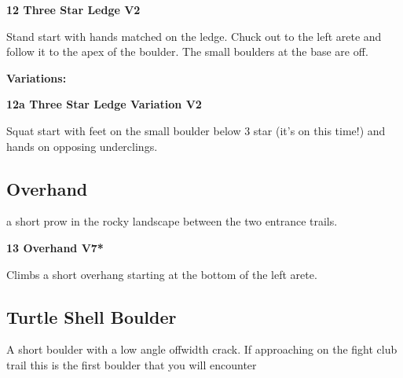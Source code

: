 \begin{multicols}{2}
		
			
			\needspace{1.5cm}
\label{rt:Three Star Ledge}
\colorbox{green!20}{
\parbox{0.95\linewidth}{
\textbf{
12 Three Star Ledge V2  
}}}

			\begin{adjustwidth}{0.5cm}{}			
			Stand start with hands matched on the ledge. Chuck out to the left arete and follow it to the apex of the boulder. The small boulders at the base are off.
			\end{adjustwidth}
			
				\begin{adjustwidth}{0.5cm}{}				
				\needspace{3cm}
				\textbf{Variations:} \newline
					
					\needspace{1.5cm}
\label{vr:Three Star Ledge Variation}
\colorbox{green!20}{
\parbox{0.95\linewidth}{
\textbf{
12a Three Star Ledge Variation V2  
}}}

					\begin{adjustwidth}{0.5cm}{}			
					Squat start with feet on the small boulder below 3 star (it's on this time!) and hands on opposing underclings.
					\end{adjustwidth}
					
					
				\end{adjustwidth}
			
		


		\needspace{1.5cm}
		\subsection*{Overhand}\label{bf:Overhand}
		a short prow in the rocky landscape between the two entrance trails.\\
	
		
			
			\needspace{1.5cm}
\label{rt:Overhand}
\colorbox{Goldenrod!50}{
\parbox{0.95\linewidth}{
\textbf{
13 Overhand V7*  
}}}

			\begin{adjustwidth}{0.5cm}{}			
			Climbs a short overhang starting at the bottom of the left arete.
			\end{adjustwidth}
			
			
		


		\needspace{1.5cm}
		\subsection*{Turtle Shell Boulder}\label{bf:Turtle Shell Boulder}
		A short boulder with a low angle offwidth crack. If approaching on the fight club trail this is the first boulder that you will encounter\\
	

\end{multicols}
